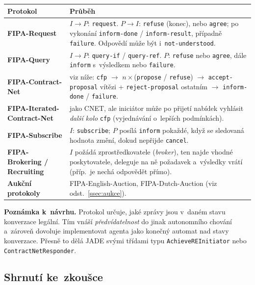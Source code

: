 \documentclass[11pt,a4paper]{article}
\theoremstyle{definition}
\begin{document}
\begin{center}\small
\begin{tabular}{p{} p{}}
\toprule
\textbf{Protokol} & \textbf{Průběh} \\
\midrule
\textbf{FIPA-Request}
  & $I \to P$: \texttt{request}. $P \to I$: \texttt{refuse} (konec), nebo \texttt{agree};
    po vykonání \texttt{inform-done} / \texttt{inform-result}, případně \texttt{failure}.
    Odpovědí může být i~\texttt{not-understood}. \\
\textbf{FIPA-Query}
  & $I \to P$: \texttt{query-if} / \texttt{query-ref}. $P$: \texttt{refuse} nebo \texttt{agree},
    dále \texttt{inform} s~výsledkem nebo \texttt{failure}. \\
\textbf{FIPA-Contract-Net}
  & viz níže: \texttt{cfp} $\to$ $n\times$(\texttt{propose} / \texttt{refuse}) $\to$
    \texttt{accept-proposal} vítězi + \texttt{reject-proposal} ostatním $\to$
    \texttt{inform-done} / \texttt{failure}. \\
\textbf{FIPA-Iterated-Contract-Net}
  & jako CNET, ale iniciátor může po přijetí nabídek vyhlásit \emph{další kolo}
    \texttt{cfp} (vyjednávání o~lepších podmínkách). \\
\textbf{FIPA-Subscribe}
  & $I$: \texttt{subscribe}; $P$ posílá \texttt{inform} pokaždé, když se sledovaná
    hodnota změní, dokud nepřijde \texttt{cancel}. \\
\textbf{FIPA-Brokering / Recruiting}
  & $I$ požádá zprostředkovatele (\emph{broker}), ten najde vhodné poskytovatele, deleguje
    na ně požadavek a~výsledky vrátí (příp.\ je nechá odpovědět přímo). \\
\textbf{Aukční protokoly}
  & FIPA-English-Auction, FIPA-Dutch-Auction (viz odst.~\ref{ssec:aukce}). \\
\bottomrule
\end{tabular}
\end{center}

\textbf{Poznámka k~návrhu.} Protokol určuje, jaké zprávy jsou v~daném stavu konverzace legální.
Tím vnáší \emph{předvídatelnost} do jinak autonomního chování a~zároveň dovoluje implementovat
agenta jako konečný automat nad stavy konverzace. Přesně to dělá JADE svými třídami typu
\texttt{AchieveREInitiator} nebo \texttt{ContractNetResponder}.

\subsection{Shrnutí ke~zkoušce}
\end{document}
